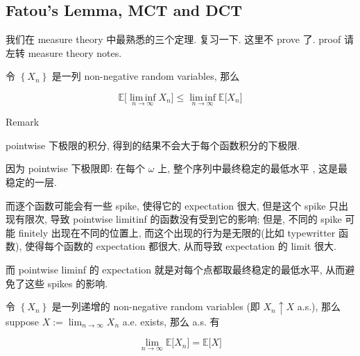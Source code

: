 \subsection{Fatou's Lemma, MCT and DCT}\label{fatous-lemma-mct-and-dct}

我们在 measure theory 中最熟悉的三个定理. 复习一下. 这里不 prove 了. proof 请左转 measure theory notes.

\begin{theorem}{}

令 \(\left\{ \mathit{X}_{\mathit{n}} \right\}\) 是一列 non-negative random variables, 那么

\[\mathbb{E}\lbrack\operatorname{lim\, inf}\limits_{\mathit{n}\rightarrow\infty}\mathit{X}_{\mathit{n}}\rbrack \leq \operatorname{lim\, inf}\limits_{\mathit{n}\rightarrow\infty}\mathbb{E}\lbrack\mathit{X}_{\mathit{n}}\rbrack\]

\end{theorem}

\begin{qlremark}{Remark}

pointwise 下极限的积分, 得到的结果不会大于每个函数积分的下极限.

因为 pointwise 下极限即: 在每个 \(\mathit{\omega}\) 上, 整个序列中最终稳定的最低水平 , 这是最稳定的一层.

而逐个函数可能会有一些 spike, 使得它的 expectation 很大, 但是这个 spike 只出现有限次, 导致 pointwise limitinf 的函数没有受到它的影响; 但是, 不同的 spike 可能 finitely 出现在不同的位置上, 而这个出现的行为是无限的(比如 typewritter 函数), 使得每个函数的 expectation 都很大, 从而导致 expectation 的 limit 很大.

而 pointwise liminf 的 expectation 就是对每个点都取最终稳定的最低水平, 从而避免了这些 spikes 的影响.

\end{qlremark}

\begin{theorem}{}

令 \(\left\{ \mathit{X}_{\mathit{n}} \right\}\) 是一列递增的 non-negative random variables (即 \(\mathit{X}_{\mathit{n}} \uparrow \mathit{X}\) a.s.), 那么 suppose \(\mathit{X} := \lim_{\mathit{n}\rightarrow\infty}\mathit{X}_{\mathit{n}}\) a.e. exists, 那么 a.s. 有

\[\lim\limits_{\mathit{n}\rightarrow\infty}\mathbb{E}\lbrack\mathit{X}_{\mathit{n}}\rbrack = \mathbb{E}\lbrack\mathit{X}\rbrack\]

\end{theorem}

